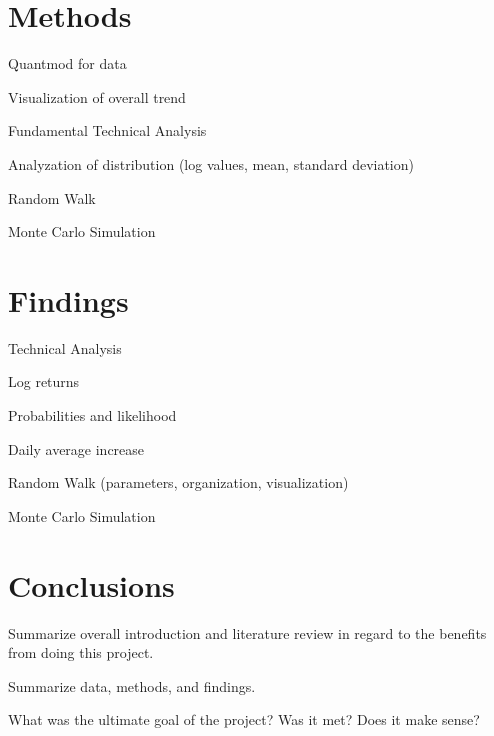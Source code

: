 \documentclass{article}
\begin{document}
\section{Methods}

\begin{description}
\item Quantmod for data
\item Visualization of overall trend
\item Fundamental Technical Analysis
\item Analyzation of distribution (log values, mean, standard deviation)
\item Random Walk
\item Monte Carlo Simulation
\end{description}

\section{Findings}

\begin{description}
\item Technical Analysis
\item Log returns
\item Probabilities and likelihood
\item Daily average increase
\item Random Walk (parameters, organization, visualization)
\item Monte Carlo Simulation
\end{description}

\section{Conclusions}

\begin{description}
\item Summarize overall introduction and literature review in regard to the benefits from doing this project.
\item Summarize data, methods, and findings.
\item What was the ultimate goal of the project? Was it met? Does it make sense?
\end{description}

\nocite{*}

\end{document}
